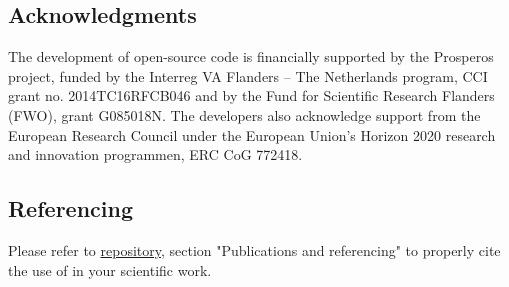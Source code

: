 \subsection{Acknowledgments}
The development of \biodeg{} open-source code is financially supported by the Prosperos project, funded by the Interreg VA Flanders – The Netherlands program, CCI grant no. 2014TC16RFCB046 and by the Fund for Scientific Research Flanders (FWO), grant G085018N. The developers also acknowledge support from the European Research Council under the European Union's Horizon 2020 research and innovation programmen, ERC CoG 772418.

\subsection{Referencing \biodeg{}}

Please refer to \href{https://github.com/mbarzegary/BioDeg}{\biodeg{} repository}, section "Publications and referencing" to properly cite the use of 
\biodeg{} in your scientific work. 
